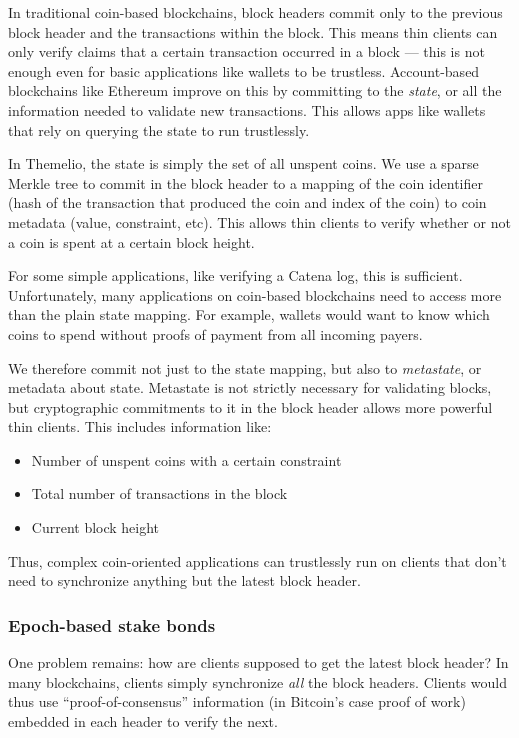 \documentclass[headinclude,12pt]{scrbook}
\begin{document}
In traditional coin-based blockchains, block headers commit only to the previous block header and the transactions within the block. This means thin clients can only verify claims that a certain transaction occurred in a block --- this is not enough even for basic applications like wallets to be trustless. Account-based blockchains like Ethereum improve on this by committing to the \textit{state}, or all the information needed to validate new transactions. This allows apps like wallets that rely on querying the state to run trustlessly.

In Themelio, the state is simply the set of all unspent coins. We use a sparse Merkle tree to commit in the block header to a mapping of the coin identifier (hash of the transaction that produced the coin and index of the coin) to coin metadata (value, constraint, etc). This allows thin clients to verify whether or not a coin is spent at a certain block height.

For some simple applications, like verifying a Catena log, this is sufficient. Unfortunately, many applications on coin-based blockchains need to access more than the plain state mapping. For example, wallets would want to know which coins to spend without proofs of payment from all incoming payers.

We therefore commit not just to the state mapping, but also to \textit{metastate}, or metadata about state. Metastate is not strictly necessary for validating blocks, but cryptographic commitments to it in the block header allows more powerful thin clients. This includes information like:
\begin{itemize}
    \item Number of unspent coins with a certain constraint
    \item Total number of transactions in the block
    \item Current block height
\end{itemize}

Thus, complex coin-oriented applications can trustlessly run on clients that don't need to synchronize anything but the latest block header.

\subsubsection{Epoch-based stake bonds}

One problem remains: how are clients supposed to get the latest block header? In many blockchains, clients simply synchronize \emph{all} the block headers. Clients would thus use ``proof-of-consensus'' information (in Bitcoin's case proof of work) embedded in each header to verify the next.
\end{document}
